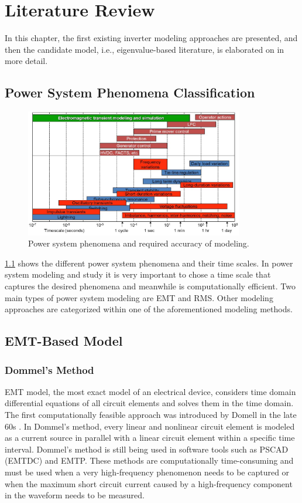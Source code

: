 \chapter{Literature Review}\label{literature}

In this chapter, the first existing inverter modeling approaches are presented, and then the candidate model, i.e., eigenvalue-based literature, is elaborated on in more detail.
\section{Power System Phenomena Classification}
\begin{figure}[ht]
    \centering
	\includegraphics[width=0.85\textwidth]{figures/Picture1.jpg}
	\caption[Power system phenomena]{Power system phenomena and required accuracy of modeling.\cite{PSCAD}}
	\label{fig:ph}
\end{figure}

\ref{fig:ph} shows the different power system phenomena and their time scales. In power system modeling and study it is very important to chose a time scale that captures the desired phenomena and meanwhile is computationally efficient. Two main types of power system modeling are \gls{EMT} and \gls{RMS}. Other modeling approaches are categorized within one of the aforementioned modeling methods.

\section{\gls{EMT}-Based Model}

\subsection{Dommel's Method}
 EMT model, the most exact model of an electrical device, considers time domain differential equations of all circuit elements and solves them in the time domain. The first computationally feasible approach was introduced by Domell in the late 60s \cite{EMT1} \cite{EMT2}. In Dommel's method, every linear and nonlinear circuit element is modeled as a current source in parallel with a linear circuit element within a specific time interval. Dommel's method is still being used in software tools such as PSCAD (EMTDC) and EMTP. These methods are computationally time-consuming and must be used when a very high-frequency phenomenon needs to be captured or when the maximum short circuit current caused by a high-frequency component in the waveform needs to be measured. 

